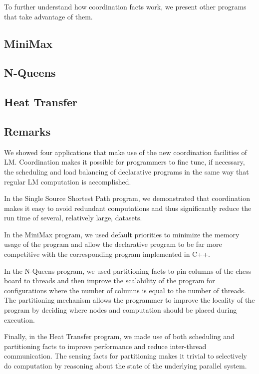 To further understand how coordination facts work, we present other programs that
take advantage of them.

\subsection{MiniMax}\label{section:coord:minimax}

\subsection{N-Queens}\label{section:coord:nqueens}

\subsection{Heat Transfer}\label{section:coord:ht}


\subsection{Remarks}

We showed four applications that make use of the new coordination facilities of
LM. Coordination makes it possible for programmers to fine tune, if necessary,
the scheduling and load balancing of declarative programs in the same way that
regular LM computation is accomplished.

In the Single Source Shortest Path program, we demonstrated that coordination
makes it easy to avoid redundant computations and thus significantly reduce the
run time of several, relatively large, datasets.

In the MiniMax program, we used default priorities to minimize the memory usage
of the program and allow the declarative program to be far more competitive
with the corresponding program implemented in C++.

In the N-Queens program, we used partitioning facts to pin columns of the chess
board to threads and then improve the scalability of the program for
configurations where the number of columns is equal to the number of threads.
The partitioning mechanism allows the programmer to improve the locality of the
program by deciding where nodes and computation should be placed during
execution.

Finally, in the Heat Transfer program, we made use of both scheduling and
partitioning facts to improve performance and reduce inter-thread communication.
The sensing facts for partitioning makes it trivial to selectively do
computation by reasoning about the state of the underlying parallel system.
